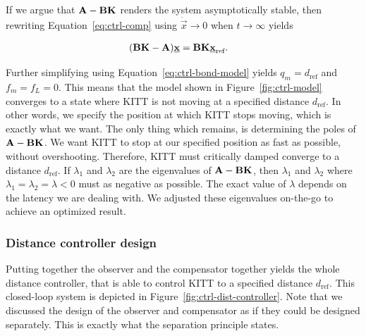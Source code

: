 \documentclass[11pt,titlepage]{report}
\begin{document}
If we argue that $\mathbf{A} - \mathbf{B} \mathbf{K}$ renders the system asymptotically stable, then rewriting Equation~\ref{eq:ctrl-comp} using $\dot{\vec{x}} \to 0$ when $t \to \infty$ yields

\begin{align*}
	(\mathbf{B} \mathbf{K} - \mathbf{A}) \mathbf{\underline{x}} &= \mathbf{B} \mathbf{K} \mathbf{\underline{x}}_{\text{ref}}.
\end{align*}

Further simplifying using Equation~\ref{eq:ctrl-bond-model} yields $q_m = d_{\text{ref}}$ and $f_m = f_L = 0$. This means that the model shown in Figure~\ref{fig:ctrl-model} converges to a state where KITT is not moving at a specified distance $d_{\text{ref}}$. In other words, we specify the position at which KITT stops moving, which is exactly what we want. The only thing which remains, is determining the poles of $\mathbf{A} - \mathbf{B} \mathbf{K}$. We want KITT to stop at our specified position as fast as possible, without overshooting. Therefore, KITT must critically damped converge to a distance $d_{\text{ref}}$. If $\lambda_1$ and $\lambda_2$ are the eigenvalues of $\mathbf{A} - \mathbf{B} \mathbf{K}$, then $\lambda_1$ and $\lambda_2$ where $\lambda_1 = \lambda_2 = \lambda < 0$ must as negative as possible. The exact value of $\lambda$ depends on the latency we are dealing with. We adjusted these eigenvalues on-the-go to achieve an optimized result.

\subsubsection{Distance controller design}
Putting together the observer and the compensator together yields the whole distance controller, that is able to control KITT to a specified distance $d_{\text{ref}}$. This closed-loop system is depicted in Figure~\ref{fig:ctrl-dist-controller}. Note that we discussed the design of the observer and compensator as if they could be designed separately. This is exactly what the separation principle states. 
\end{document}
